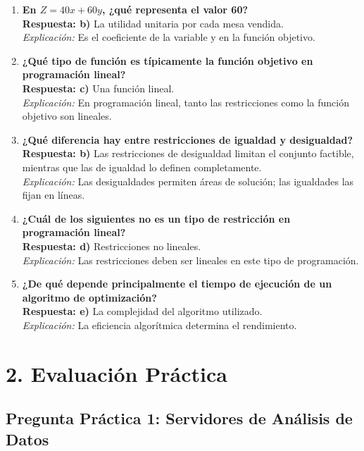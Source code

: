 \documentclass[12pt]{article}
\begin{document}
\begin{enumerate}
		\item \textbf{En $Z = 40x + 60y$, ¿qué representa el valor 60?} \\
		\textbf{Respuesta: b)} La utilidad unitaria por cada mesa vendida. \\
		\textit{Explicación:} Es el coeficiente de la variable y en la función objetivo.
		
		\item \textbf{¿Qué tipo de función es típicamente la función objetivo en programación lineal?} \\
		\textbf{Respuesta: c)} Una función lineal. \\
		\textit{Explicación:} En programación lineal, tanto las restricciones como la función objetivo son lineales.
		
		\item \textbf{¿Qué diferencia hay entre restricciones de igualdad y desigualdad?} \\
		\textbf{Respuesta: b)} Las restricciones de desigualdad limitan el conjunto factible, mientras que las de igualdad lo definen completamente. \\
		\textit{Explicación:} Las desigualdades permiten áreas de solución; las igualdades las fijan en líneas.
		
		\item \textbf{¿Cuál de los siguientes no es un tipo de restricción en programación lineal?} \\
		\textbf{Respuesta: d)} Restricciones no lineales. \\
		\textit{Explicación:} Las restricciones deben ser lineales en este tipo de programación.
		
		\item \textbf{¿De qué depende principalmente el tiempo de ejecución de un algoritmo de optimización?} \\
		\textbf{Respuesta: e)} La complejidad del algoritmo utilizado. \\
		\textit{Explicación:} La eficiencia algorítmica determina el rendimiento.
	\end{enumerate}
	
	\newpage
	
	\section*{2. Evaluación Práctica}
	
	\subsection*{Pregunta Práctica 1: Servidores de Análisis de Datos}
	
\end{document}
